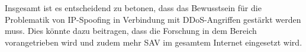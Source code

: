 \documentclass[sigplan,screen]{acmart}
\begin{document}
Insgesamt ist es entscheidend zu betonen, dass das Bewusstsein für die Problematik von IP-Spoofing in Verbindung mit DDoS-Angriffen gestärkt werden muss. Dies könnte dazu beitragen, dass die Forschung in dem Bereich vorangetrieben wird und zudem mehr SAV im gesamtem Internet eingesetzt wird.




\appendix
\end{document}
